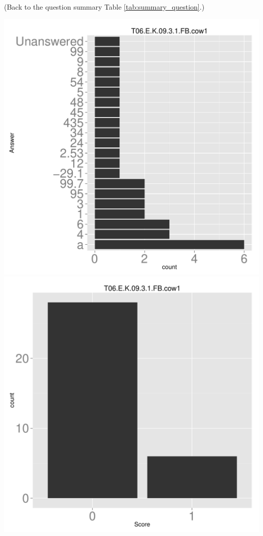 \documentclass[12pt,nohyper]{tufte-handout}\usepackage[]{graphicx}\usepackage[]{color}
\begin{document}
 (Back to the question summary Table \ref{tab:summary_question}.)

\begin{center} \includegraphics[width=.45\linewidth]{Topic06_30_answer} \includegraphics[width=.45\linewidth]{Topic06_30_score} \end{center} 
\end{document}
